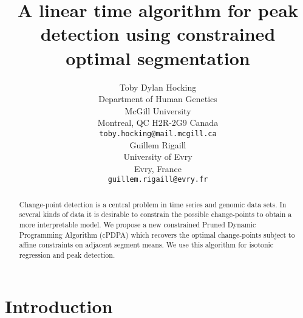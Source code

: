 \documentclass{article}
\begin{document}
\title{A linear time algorithm for peak detection using constrained
  optimal segmentation}

\author{
  Toby Dylan Hocking\\
  Department of Human Genetics\\
  McGill University\\
  Montreal, QC H2R-2G9 Canada \\
  \texttt{toby.hocking@mail.mcgill.ca} \\
  \And
  Guillem Rigaill \\
  University of Evry \\
  Evry, France \\
  \texttt{guillem.rigaill@evry.fr} \\
}

\maketitle

\begin{abstract}
  Change-point detection is a central problem in time series and
  genomic data sets. In several kinds of data it is desirable to
  constrain the possible change-points to obtain a more interpretable
  model. We propose a new constrained Pruned Dynamic Programming
  Algorithm (cPDPA) which recovers the optimal change-points subject
  to affine constraints on adjacent segment means. We use this
  algorithm for isotonic regression and peak detection.
\end{abstract}

\section{Introduction}
\end{document}
